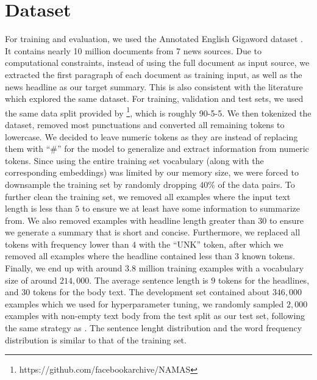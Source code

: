 \section{Dataset}
\label{sec: dataset}

For training and evaluation, we used the Annotated English Gigaword dataset \cite{graff2003english}. It contains nearly 10 million documents from 7 news sources. Due to computational constraints, instead of using the full document as input source, we extracted the first paragraph of each document as training input, as well as the news headline as our target summary. This is also consistent with the literature which explored the same dataset. For training, validation and test sets, we used the same data split provided by \cite{rush2015neural} \footnote{https://github.com/facebookarchive/NAMAS}, which is roughly 90-5-5. We then tokenized the dataset, removed most punctuations and converted all remaining tokens to lowercase. We decided to leave numeric tokens as they are instead of replacing them with ``$\#$'' for the model to generalize and extract information from numeric tokens. Since using the entire training set vocabulary (along with the corresponding embeddings) was limited by our memory size, we were forced to downsample the training set by randomly dropping $40\%$ of the data pairs. To further clean the training set, we removed all examples where the input text length is less than $5$ to ensure we at least have some information to summarize from. We also removed examples with headline length greater than $30$ to ensure we generate a summary that is short and concise. Furthermore, we replaced all tokens with frequency lower than $4$ with the ``UNK'' token, after which we removed all examples where the headline contained less than $3$ known tokens. Finally, we end up with around $3.8$ million training examples with a vocabulary size of around $214,000$. The average sentence length is $9$ tokens for the headlines, and $30$ tokens for the body text. The development set contained about $346,000$ examples which we used for hyperparameter tuning, we randomly sampled $2,000$ examples with non-empty text body from the test split as our test set, following the same strategy as \cite{rush2015neural}. The sentence lenght distribution and the word frequency distribution is similar to that of the training set.